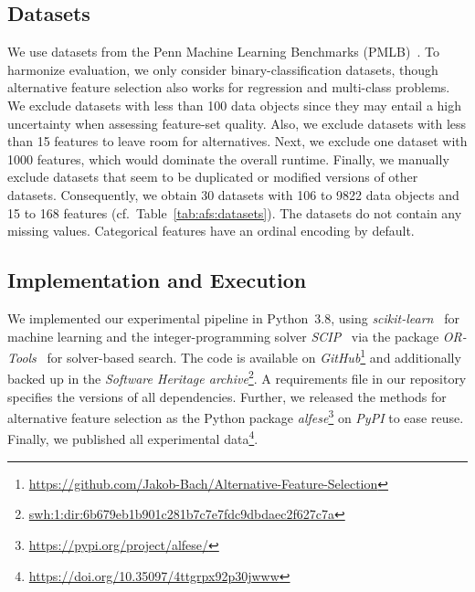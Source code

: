 \documentclass{article}
\theoremstyle{definition}
\begin{document}
\subsection{Datasets}
\label{sec:afs:experimental-design:datasets}

We use datasets from the Penn Machine Learning Benchmarks (PMLB)~\cite{olson2017pmlb,romano2021pmlb}.
To harmonize evaluation, we only consider binary-classification datasets, though alternative feature selection also works for regression and multi-class problems.
We exclude datasets with less than 100 data objects since they may entail a high uncertainty when assessing feature-set quality.
Also, we exclude datasets with less than 15 features to leave room for alternatives.
Next, we exclude one dataset with 1000 features, which would dominate the overall runtime.
Finally, we manually exclude datasets that seem to be duplicated or modified versions of other datasets.
Consequently, we obtain 30 datasets with 106 to 9822 data objects and 15 to 168 features (cf.~Table~\ref{tab:afs:datasets}).
The datasets do not contain any missing values.
Categorical features have an ordinal encoding by default.

\subsection{Implementation and Execution}
\label{sec:afs:experimental-design:implementation}

We implemented our experimental pipeline in Python~3.8, using \emph{scikit-learn}~\cite{pedregosa2011scikit-learn} for machine learning and the integer-programming solver \emph{SCIP}~\cite{bestuzheva2021scip} via the package \emph{OR-Tools}~\cite{perron2022or-tools} for solver-based search.
The code is available on \emph{GitHub}\footnote{\url{https://github.com/Jakob-Bach/Alternative-Feature-Selection}} and additionally backed up in the \emph{Software Heritage archive}\footnote{\href{https://archive.softwareheritage.org/swh:1:dir:6b679eb1b901c281b7c7e7fdc9dbdaec2f627c7a;origin=https://github.com/Jakob-Bach/Alternative-Feature-Selection;visit=swh:1:snp:e1e4ba6be250fa9a7de03fa2103ac206abdb8d17;anchor=swh:1:rev:7d027c23820fce067cce8953fdfdac719722949b}{swh:1:dir:6b679eb1b901c281b7c7e7fdc9dbdaec2f627c7a}}.
A requirements file in our repository specifies the versions of all dependencies.
Further, we released the methods for alternative feature selection as the Python package \emph{alfese}\footnote{\url{https://pypi.org/project/alfese/}} on \emph{PyPI} to ease reuse.
Finally, we published all experimental data\footnote{\url{https://doi.org/10.35097/4ttgrpx92p30jwww}}.
\end{document}

